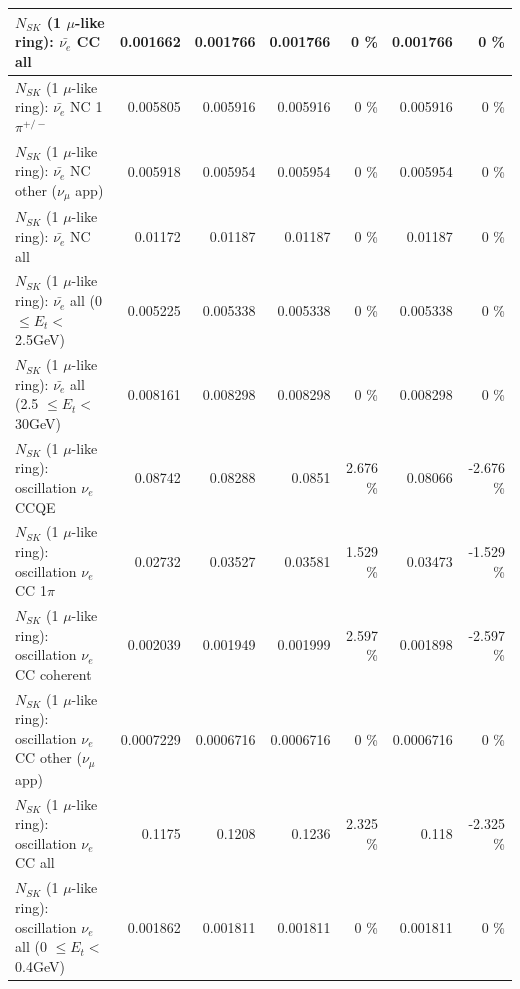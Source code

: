 \begin{table}
\begin{tabular}{| l | r | r | r  r | r  r |}
                            $N_{SK}$ (1 $\mu$-like ring): $\bar{\nu_{e}}$ CC all &        0.001662 &        0.001766 &        0.001766 &        0 \%  &        0.001766 &        0 \%  \\ 
\hline
                     $N_{SK}$ (1 $\mu$-like ring): $\bar{\nu_e}$ NC 1$\pi^{+/-}$ &        0.005805 &        0.005916 &        0.005916 &        0 \%  &        0.005916 &        0 \%  \\ 
            $N_{SK}$ (1 $\mu$-like ring): $\bar{\nu_e}$ NC other ($\nu_\mu$ app) &        0.005918 &        0.005954 &        0.005954 &        0 \%  &        0.005954 &        0 \%  \\ 
                            $N_{SK}$ (1 $\mu$-like ring): $\bar{\nu_{e}}$ NC all &         0.01172 &         0.01187 &         0.01187 &        0 \%  &         0.01187 &        0 \%  \\ 
\hline
     $N_{SK}$ (1 $\mu$-like ring): $\bar{\nu_{e}}$ all (0 $\leq E_{t} <$ 2.5GeV) &        0.005225 &        0.005338 &        0.005338 &        0 \%  &        0.005338 &        0 \%  \\ 
    $N_{SK}$ (1 $\mu$-like ring): $\bar{\nu_{e}}$ all (2.5 $\leq E_{t} <$ 30GeV) &        0.008161 &        0.008298 &        0.008298 &        0 \%  &        0.008298 &        0 \%  \\ 
\hline
\hline
\hline
                          $N_{SK}$ (1 $\mu$-like ring): oscillation $\nu_e$ CCQE &         0.08742 &         0.08288 &          0.0851 &    2.676 \%  &         0.08066 &   -2.676 \%  \\ 
                     $N_{SK}$ (1 $\mu$-like ring): oscillation $\nu_e$ CC 1$\pi$ &         0.02732 &         0.03527 &         0.03581 &    1.529 \%  &         0.03473 &   -1.529 \%  \\ 
                   $N_{SK}$ (1 $\mu$-like ring): oscillation $\nu_e$ CC coherent &        0.002039 &        0.001949 &        0.001999 &    2.597 \%  &        0.001898 &   -2.597 \%  \\ 
      $N_{SK}$ (1 $\mu$-like ring): oscillation $\nu_e$ CC other ($\nu_\mu$ app) &       0.0007229 &       0.0006716 &       0.0006716 &        0 \%  &       0.0006716 &        0 \%  \\ 
                       $N_{SK}$ (1 $\mu$-like ring): oscillation $\nu_e$  CC all &          0.1175 &          0.1208 &          0.1236 &    2.325 \%  &           0.118 &   -2.325 \%  \\ 
\hline
$N_{SK}$ (1 $\mu$-like ring): oscillation $\nu_{e}$ all (0 $\leq E_{t} <$ 0.4GeV) &        0.001862 &        0.001811 &        0.001811 &        0 \%  &        0.001811 &        0 \%  \\ 

\end{tabular}
\end{table}
